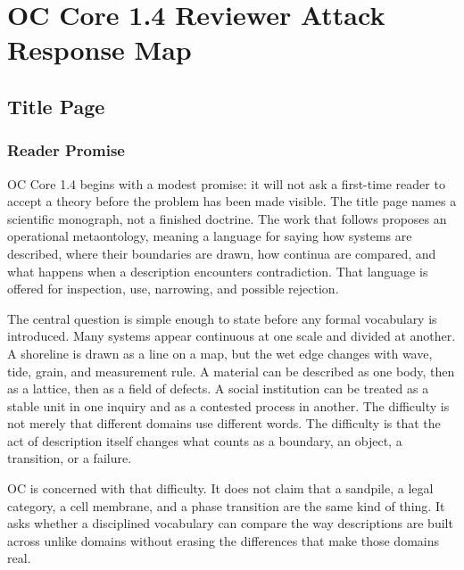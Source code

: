 \documentclass[11pt,a4paper,openany]{book}
\begin{document}
\chapter{OC Core 1.4 Reviewer Attack Response Map}
\section{Title Page}
\subsection{Reader Promise}
OC Core 1.4 begins with a modest promise: it will not ask a first-time reader to accept a theory before the problem has been made visible. The title page names a scientific monograph, not a finished doctrine. The work that follows proposes an operational metaontology, meaning a language for saying how systems are described, where their boundaries are drawn, how continua are compared, and what happens when a description encounters contradiction. That language is offered for inspection, use, narrowing, and possible rejection. \cite{stauffer_percolation,grimmett_percolation}\par
The central question is simple enough to state before any formal vocabulary is introduced. Many systems appear continuous at one scale and divided at another. A shoreline is drawn as a line on a map, but the wet edge changes with wave, tide, grain, and measurement rule. A material can be described as one body, then as a lattice, then as a field of defects. A social institution can be treated as a stable unit in one inquiry and as a contested process in another. The difficulty is not merely that different domains use different words. The difficulty is that the act of description itself changes what counts as a boundary, an object, a transition, or a failure.\par
OC is concerned with that difficulty. It does not claim that a sandpile, a legal category, a cell membrane, and a phase transition are the same kind of thing. It asks whether a disciplined vocabulary can compare the way descriptions are built across unlike domains without erasing the differences that make those domains real.\par
\end{document}
